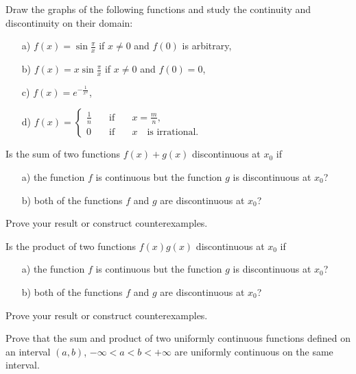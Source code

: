 \documentclass[11pt]{article}%
\begin{document}
\begin{Exercise}[title=*$\dagger$] Draw the graphs of the following functions and study the continuity and discontinuity on their domain:
	\begin{itemize}
		\item[a)]{$f(x)=\sin\frac{\pi}{x}$ if $x\neq 0$ and $f(0)$ is arbitrary,}
		\item[b)]{$f(x)=x\sin\frac{\pi}{x}$ if $x\neq 0$ and $f(0)=0$,}
		\item[c)]{$f(x)=e^{-\frac{1}{x^2}}$,}
		\item[d)]{$f(x)=\left\{\begin{array}{lllc}\frac{1}{n} \quad & \text{if}\quad & x=\frac{m}{n},\\
				0 &\text{if}  & x\quad\text{is irrational}.\end{array}\right.
			$}
	\end{itemize}
\end{Exercise}

\begin{Exercise}[title=*]
	Is the sum of two functions $f(x)+g(x)$ discontinuous at $x_0$ if 
	\begin{itemize}
		\item[a)]{the function $f$ is continuous but the function $g$ is discontinuous at $x_0$?}
		\item[b)]{both of the functions $f$ and $g$ are discontinuous at $x_0$?}
	\end{itemize} Prove your result or construct counterexamples.
\end{Exercise}

\begin{Exercise}[title=*]
	Is the product of two functions $f(x)g(x)$ discontinuous at $x_0$ if 
	\begin{itemize}
		\item[a)]{the function $f$ is continuous but the function $g$ is discontinuous at $x_0$?}
		\item[b)]{both of the functions $f$ and $g$ are discontinuous at $x_0$?}
	\end{itemize} Prove your result or construct counterexamples.
\end{Exercise}



\begin{Exercise}[title=**]
	Prove that the sum and product of two uniformly continuous functions defined on an interval $(a,b)$, $-\infty<a<b<+\infty$ are uniformly continuous on the same interval.
\end{Exercise}
\end{document}
